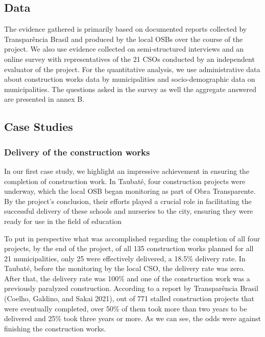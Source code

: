 \documentclass[]{AEA}
\begin{document}
\hypertarget{data}{%
\subsection{Data}\label{data}}

The evidence gathered is primarily based on documented reports collected
by Transparência Brasil and produced by the local OSBs over the course
of the project. We also use evidence collected on semi-structured
interviews and an online survey with representatives of the 21 CSOs
conducted by an independent evaluator of the project. For the
quantitative analysis, we use administrative data about construction
works data by municipalities and socio-demographic data on
municipalities. The questions asked in the survey as well the aggregate
answered are presented in annex B.

\hypertarget{case-studies}{%
\subsection{Case Studies}\label{case-studies}}

\hypertarget{delivery-of-the-construction-works}{%
\subsubsection{Delivery of the construction
works}\label{delivery-of-the-construction-works}}

In our first case study, we highlight an impressive achievement in
ensuring the completion of construction work. In Taubaté, four
construction projects were underway, which the local OSB began
monitoring as part of Obra Transparente. By the project's conclusion,
their efforts played a crucial role in facilitating the successful
delivery of these schools and nurseries to the city, ensuring they were
ready for use in the field of education

To put in perspective what was accomplished regarding the completion of
all four projects, by the end of the project, of all 135 construction
works planned for all 21 municipalities, only 25 were effectively
delivered, a 18.5\% delivery rate. In Taubaté, before the monitoring by
the local CSO, the delivery rate was zero. After that, the delivery rate
was 100\% and one of the construction work was a previously paralyzed
construction. According to a report by Transparência Brasil (Coelho,
Galdino, and Sakai 2021), out of 771 stalled construction projects that
were eventually completed, over 50\% of them took more than two years to
be delivered and 25\% took three years or more. As we can see, the odds
were against finishing the construction works.
\end{document}
